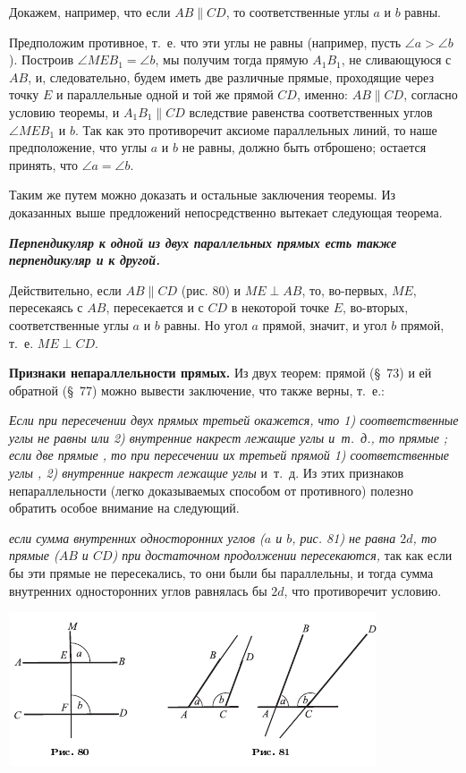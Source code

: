 \documentclass[oneside]{book}
\begin{document}
Докажем, например, что если $AB\parallel CD$, то соответственные углы $a$ и $b$ равны.

Предположим противное, т.~е. что эти углы не равны (например, пусть $\angle a > \angle b$).
Построив $\angle MEB_1 = \angle b$, мы получим тогда прямую $A_1B_1$, не сливающуюся с $AB$, и, следовательно, будем иметь две различные прямые, проходящие через точку $E$ и параллельные одной и той же прямой $CD$, именно:
$AB\parallel CD$, согласно условию теоремы, и $A_1B_1\parallel CD$ вследствие равенства соответственных углов $\angle MEB_1$ и $b$.
Так как это противоречит аксиоме параллельных линий, то наше предположение, что углы $a$ и $b$ не равны, должно быть отброшено;
остается принять, что $\angle a = \angle b$.

Таким же путем можно доказать и остальные заключения теоремы.
Из доказанных выше предложений непосредственно вытекает следующая теорема.

\textbf{\emph{Перпендикуляр к одной из двух параллельных прямых есть также перпендикуляр и к другой.}}

Действительно, если $AB\parallel CD$ (рис. 80) и $ME\perp AB$, то, во-первых, $ME$, пересекаясь с $AB$, пересекается и с $CD$ в некоторой точке $E$, во-вторых, соответственные углы $a$ и $b$ равны.
Но угол $a$ прямой, значит, и угол $b$ прямой, т.~е.
$ME\perp CD$.

\textbf{Признаки непараллельности прямых.}
Из двух теорем:
прямой (§~73) и ей обратной (§~77) можно вывести заключение, что  также верны, т.~е.:

\emph{Если при пересечении двух прямых третьей окажется, что 1) соответственные углы не равны или 2) внутренние накрест лежащие углы  и~т.~д., то прямые ;
если две прямые , то при пересечении их третьей прямой 1) соответственные углы , 2) внутренние накрест лежащие углы } и~т.~д.
Из этих признаков непараллельности (легко доказываемых способом от противного) полезно обратить особое внимание на следующий.

\emph{если сумма внутренних односторонних углов \emph{($a$ и $b$, рис. 81)} не равна $2d$, то прямые \emph{($AB$ и $CD$)} при достаточном продолжении пересекаются,} так как если бы эти прямые не пересекались, то они были бы параллельны, и тогда сумма внутренних односторонних углов равнялась бы $2d$, что противоречит условию.

\includegraphics{pics/ris-80-81}
\end{document}
